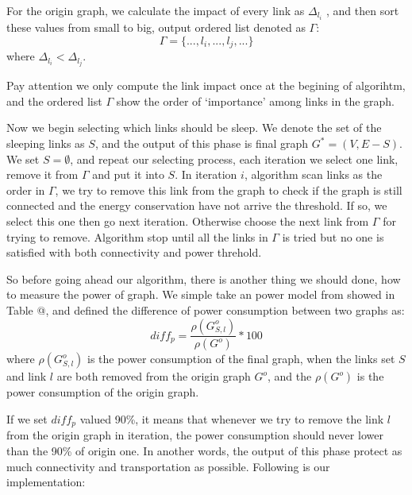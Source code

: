 \documentclass[conference]{IEEEtran}
\makeatletter
\newcommand{\Rmnum}[1]{\expandafter\@slowromancap\romannumeral #1@}
\makeatother
\begin{document}
For the origin graph, we calculate the impact of every link as $\Delta_{l_i}$ , and then sort these values
from small to big, output ordered list denoted as $\Gamma$: 
\begin{equation}
	\Gamma = \{..., l_i, ..., l_j, ...\}
\end{equation}
where $\Delta_{l_i} < \Delta_{l_j}$.


Pay attention we only compute the link impact once at the begining of algorihtm, and the ordered list $\Gamma$ show 
the order of `importance' among links in the graph. 


Now we begin selecting which links should be sleep.
We denote the set of the sleeping links as $S$, and the output of this phase is final graph $G^* = (V, E-S)$. We set 
$S = \emptyset$, and repeat our selecting process, each iteration we select one link, remove it from $\Gamma$ and put it into $S$. 
In iteration $i$, algorithm scan links as the order in $\Gamma$, we try to
remove this link from the graph to check if the graph is still connected and the energy conservation have not arrive the threshold.
If so, we select this one then go next iteration.
Otherwise choose the next link from $\Gamma$ for trying to remove. Algorithm
stop until all the links in $\Gamma$ is tried but no one is satisfied with both connectivity and power threhold.


So before going ahead our algorithm, there is another thing we should done, how to measure the power of graph.
We simple take an power model from \cite{networking:greente} showed in Table \Rmnum{2}, and defined the difference of power consumption 
between two graphs as:
\begin{equation}
	diff_p = \frac{\rho(G_{S, l}^o)} {\rho(G^o)} * 100
\end{equation}
where $\rho(G_{S, l}^o)$ is the power consumption of the final graph, when the links set $S$ and 
link $l$ are both removed from the origin graph $G^o$, and the $\rho(G^o)$ is the power consumption of 
the origin graph.


If we set $diff_p$ valued 90\%, it means that whenever we try to remove the link $l$ from the origin graph in 
iteration, the power consumption should never lower than the 90\% of origin one. In another words, the output 
of this phase protect as much connectivity and transportation as possible. Following is our implementation: 
\end{document}
